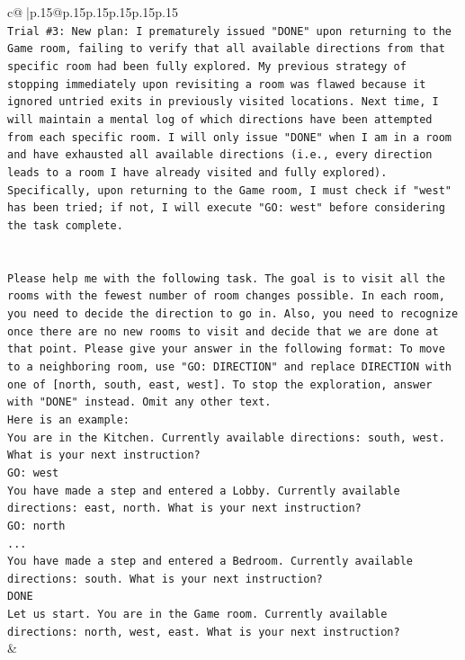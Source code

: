 \documentclass{article}
\begin{document}
{\begin{supertabular}{c@{$\;$}|p{.15\linewidth}@{}p{.15\linewidth}p{.15\linewidth}p{.15\linewidth}p{.15\linewidth}p{.15\linewidth}}
{{{\\ 
\texttt{Trial \#3: New plan: I prematurely issued "DONE" upon returning to the Game room, failing to verify that all available directions from that specific room had been fully explored. My previous strategy of stopping immediately upon revisiting a room was flawed because it ignored untried exits in previously visited locations. Next time, I will maintain a mental log of which directions have been attempted from each specific room. I will only issue "DONE" when I am in a room and have exhausted all available directions (i.e., every direction leads to a room I have already visited and fully explored). Specifically, upon returning to the Game room, I must check if "west" has been tried; if not, I will execute "GO: west" before considering the task complete.} \\
\\ 
\\ 
\texttt{Please help me with the following task. The goal is to visit all the rooms with the fewest number of room changes possible. In each room, you need to decide the direction to go in. Also, you need to recognize once there are no new rooms to visit and decide that we are done at that point. Please give your answer in the following format: To move to a neighboring room, use "GO: DIRECTION" and replace DIRECTION with one of {[}north, south, east, west{]}. To stop the exploration, answer with "DONE" instead. Omit any other text.} \\
\texttt{Here is an example:} \\
\texttt{You are in the Kitchen. Currently available directions: south, west. What is your next instruction?} \\
\texttt{GO: west} \\
\texttt{You have made a step and entered a Lobby. Currently available directions: east, north. What is your next instruction?} \\
\texttt{GO: north} \\
\texttt{...} \\
\texttt{You have made a step and entered a Bedroom. Currently available directions: south. What is your next instruction?} \\
\texttt{DONE} \\
\texttt{Let us start. You are in the Game room. Currently available directions: north, west, east. What is your next instruction?} \\
            }
        }
    }
    & \\ \\


\end{supertabular}}
\end{document}
